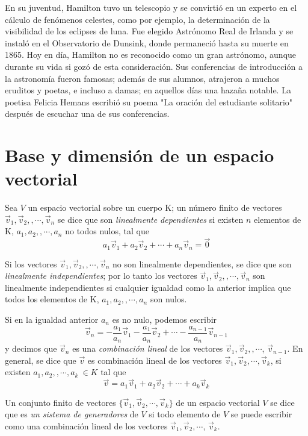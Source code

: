 \begin{parchment}
{En su juventud, Hamilton tuvo un telescopio y se convirtió en un experto en el cálculo de fenómenos celestes, como por ejemplo, la determinación de la visibilidad de los eclipses de luna. Fue elegido Astrónomo Real de Irlanda y se instaló en el Observatorio de Dunsink, donde permaneció hasta su muerte en 1865.
Hoy en día, Hamilton no es reconocido como un gran astrónomo, aunque durante su vida si gozó de esta consideración. Sus conferencias de introducción a la astronomía fueron famosas; además de sus alumnos, atrajeron a muchos eruditos y poetas, e incluso a damas; en aquellos días una hazaña notable. La poetisa Felicia Hemans escribió su poema "La oración del estudiante solitario" después de escuchar una de sus conferencias.  \cite{hamilton}}
\end{parchment}

\bigskip

\section{Base y dimensión de un espacio vectorial}

Sea $V$ un espacio vectorial sobre un cuerpo K; un número finito de vectores  $\vec{v}_1, \vec{v}_2, ,\cdots, \vec{v}_n$  se dice que son \textit{linealmente dependientes} si existen $n$ elementos de K, $a_1, a_2, ,\cdots, a_n$  no todos nulos, tal que 
$$a_1\vec{v}_1+a_2\vec{v}_2+\cdots +a_n\vec{v}_n=\vec{0}$$

Si los vectores $\vec{v}_1, \vec{v}_2, ,\cdots, \vec{v}_n$ no son linealmente dependientes, se dice que son \textit{linealmente independientes}; por lo tanto los vectores $\vec{v}_1, \vec{v}_2, ,\cdots, \vec{v}_n$  son linealmente independientes si cualquier igualdad como la anterior implica que todos los elementos de K, $a_1, a_2, ,\cdots, a_n$  son  nulos.

Si en la igualdad anterior $a_n$ es no nulo, podemos escribir
$$\vec{v}_n=- \frac{ a_1}{a_n}\vec{v}_1- \frac{ a_1}{a_n}\vec{v}_2+\cdots - \frac{ a_{n-1}}{a_n}\vec{v}_{n-1}$$
 y decimos que $\vec{v}_n$ es una \textit{combinación lineal} de los vectores $\vec{v}_1, \vec{v}_2, ,\cdots$, $\vec{v}_{n-1}$. En general, se dice que $\vec{v}$ es combinación lineal de los vectores $\vec{v}_1, \vec{v}_2, \cdots, \vec{v}_k$, si existen  $a_1, a_2, ,\cdots, a_k ~ \in K$  tal que 
$$\vec{v}=a_1\vec{v}_1+a_2\vec{v}_2+\cdots +a_k\vec{v}_k$$

\bigskip

Un conjunto finito de vectores $\{ \vec{v}_1,\vec{v}_2,\cdots, \vec{v}_k\}$ de un espacio vectorial $V$ se dice que es \textsl{un sistema de generadores} de $V$ si todo elemento de $V$ se puede escribir como una combinación lineal de los vectores $\vec{v}_1,\vec{v}_2,\cdots$, $\vec{v}_k$.

